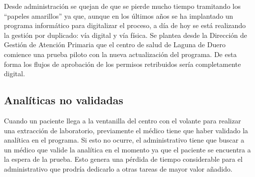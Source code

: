 Desde administración se quejan de que se pierde mucho tiempo tramitando los ``papeles amarillos'' ya que, aunque en los últimos años se ha implantado un programa informático para digitalizar el proceso, a día de hoy se está realizando la gestión por duplicado: vía digital y vía física.
Se plantea desde la Dirección de Gestión de Atención Primaria que el centro de salud de Laguna de Duero comience una prueba piloto con la nueva actualización del programa.
De esta forma los flujos de aprobación de los permisos retribuidos sería completamente digital.

\subsection{Analíticas no validadas}

Cuando un paciente llega a la ventanilla del centro con el volante para realizar una extracción de laboratorio, previamente el médico tiene que haber validado la analítica en el programa.
Si esto no ocurre, el administrativo tiene que buscar a un médico que valide la analítica en el momento ya que el paciente se encuentra a la espera de la prueba.
Esto genera una pérdida de tiempo considerable para el administrativo que prodría dedicarlo a otras tareas de mayor valor añadido.